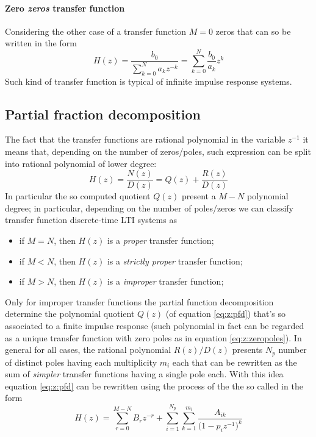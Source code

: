 	\paragraph{Zero \textit{zeros} transfer function} Considering the other case of a transfer function $M=0$ zeros that can so be written in the form
	\begin{equation}
		H(z) = \frac{b_0}{\sum_{k=0}^N a_k z^{-k}} = \sum_{k=0}^N \frac{b_0}{a_k} z^k 
	\end{equation}
	Such kind of transfer function is typical of infinite impulse response systems.
	
	\subsection{Partial fraction decomposition}
		The fact that the transfer functions are rational polynomial in the variable $z^{-1}$ it means that, depending on the number of zeros/poles, such expression can be split into rational polynomial of lower degree:
		\begin{equation} \label{eq:z:pfd}
			 H(z) = \frac{N(z)}{D(z)} = Q(z) + \frac{R(z)}{D(z)}
		\end{equation}
		In particular the so computed quotient $Q(z)$ present a $M-N$ polynomial degree; in particular, depending on the number of poles/zeros we can classify transfer function discrete-time LTI systems as
		\begin{itemize}
			\item if $M=N$, then $H(z)$ is a \textit{proper} transfer function;
			\item if $M<N$, then $H(z)$ is a \textit{strictly proper} transfer function;
			\item if $M>N$, then $H(z)$ is a \textit{improper} transfer function;
		\end{itemize}
		Only for improper transfer functions the partial function decomposition determine the polynomial quotient $Q(z)$ (of equation \ref{eq:z:pfd}) that's so associated to a finite impulse response (such polynomial in fact can be regarded as a unique transfer function with zero poles as in equation \ref{eq:z:zeropoles}). In general for all cases, the rational polynomial $R(z)/D(z)$ presents $N_p$ number of distinct poles having each multiplicity $m_i$ each that can be rewritten as the sum of \textit{simpler} transfer functions having a single pole each. With this idea equation \ref{eq:z:pfd} can be rewritten using the process of the the so called  in the form
		\begin{equation} \label{eq:z:pfdextended}
			H(z) = \sum_{r=0}^{M-N} B_r z^{-r} + \sum_{i=1}^{N_p} \sum_{k=1}^{m_i} \frac{A_{ik}}{\big(1-p_i z^{-1}\big)^k}
		\end{equation}
